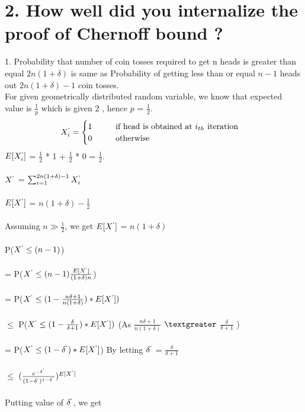 \documentclass{article}
\begin{document}
\section*{2. How well did you internalize the proof of Chernoff bound ?} 
1. Probability that number of coin tosses required to get n heads is greater than equal $2n(1 + \delta)$ is same as Probability of getting less than or equal $n-1$ heads out $2n(1 + \delta) - 1$ coin tosses. \\ 
For given geometrically distributed random variable, we know that expected value is $\frac{1}{p}$ which is given $2$ , hence $p$ = $\frac{1}{2}$. \\
\[
	X_i^{`} =\begin{cases}
		1  \hspace{1cm}   $if head is obtained at $i_{th}$ iteration$ \\
		0  \hspace{1cm}   $otherwise$ 
		\end{cases}
\] %
$E[X_i^{`}]$ = $\frac{1}{2}$ * 1 + $\frac{1}{2}$ * 0 = $\frac{1}{2}$. \\\\
$X^{`}$ = $\sum_{i=1}^{2n(1 + \delta) - 1}X_i^{`}$ \\\\
$E[X^{`}]$ = $n(1+\delta) - \frac{1}{2}$ \\\\
Assuming $n \gg \frac{1}{2}$, we get $E[X^{`}]$ =  $n(1+\delta) $ \\\\
P($X^{`} \leq (n-1)$) \\\\
= P($X^{`} \leq (n-1)\frac{E[X^{`}]}{(1 + \delta)n}$)\\\\
= P($X^{`} \leq (1 - \frac{n\delta+1}{n(1+\delta)})*E[X^{`}])$ \\\\
$\leq$ P($X^{`} \leq (1 - \frac{\delta}{\delta + 1})*E[X^{`}])$ (As $\frac{n\delta+1}{n(1+\delta)}$ $\textgreater$ $\frac{\delta}{\delta + 1}$ )\\\\
= P($X^{`} \leq (1 - \delta^{`})*E[X^{`}] $)
By letting $\delta^{`}$ = $\frac{\delta}{\delta + 1}$ \\\\ 
$\leq$ $(\frac{e^{-\delta^{`}}}{(1 - \delta^{`})^{1 - \delta^{`}}})^{E[X^{`}]}$\\\\
Putting value of $\delta^{`}$, we get \\\\ 
\end{document}
